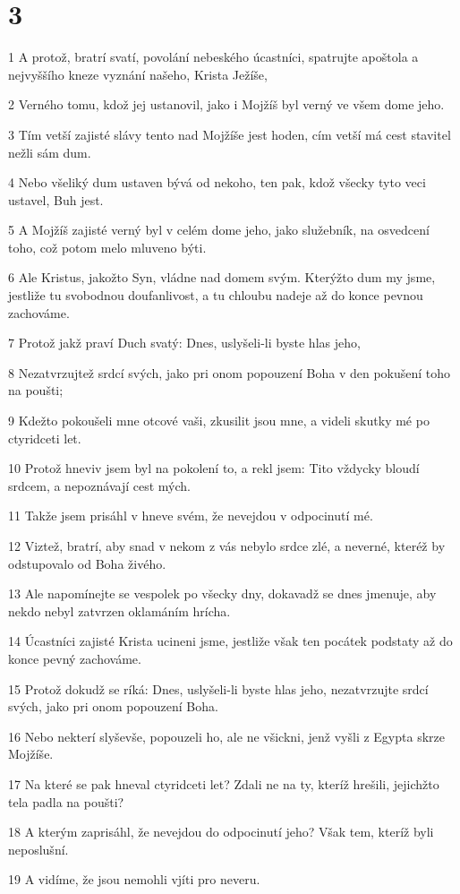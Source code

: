 \chapter{3}

\par 1 A protož, bratrí svatí, povolání nebeského úcastníci, spatrujte apoštola a nejvyššího kneze vyznání našeho, Krista Ježíše,
\par 2 Verného tomu, kdož jej ustanovil, jako i Mojžíš byl verný ve všem dome jeho.
\par 3 Tím vetší zajisté slávy tento nad Mojžíše jest hoden, cím vetší má cest stavitel nežli sám dum.
\par 4 Nebo všeliký dum ustaven bývá od nekoho, ten pak, kdož všecky tyto veci ustavel, Buh jest.
\par 5 A Mojžíš zajisté verný byl v celém dome jeho, jako služebník, na osvedcení toho, což potom melo mluveno býti.
\par 6 Ale Kristus, jakožto Syn, vládne nad domem svým. Kterýžto dum my jsme, jestliže tu svobodnou doufanlivost, a tu chloubu nadeje až do konce pevnou zachováme.
\par 7 Protož jakž praví Duch svatý: Dnes, uslyšeli-li byste hlas jeho,
\par 8 Nezatvrzujtež srdcí svých, jako pri onom popouzení Boha v den pokušení toho na poušti;
\par 9 Kdežto pokoušeli mne otcové vaši, zkusilit jsou mne, a videli skutky mé po ctyridceti let.
\par 10 Protož hneviv jsem byl na pokolení to, a rekl jsem: Tito vždycky bloudí srdcem, a nepoznávají cest mých.
\par 11 Takže jsem prisáhl v hneve svém, že nevejdou v odpocinutí mé.
\par 12 Viztež, bratrí, aby snad v nekom z vás nebylo srdce zlé, a neverné, kteréž by odstupovalo od Boha živého.
\par 13 Ale napomínejte se vespolek po všecky dny, dokavadž se dnes jmenuje, aby nekdo nebyl zatvrzen oklamáním hrícha.
\par 14 Úcastníci zajisté Krista ucineni jsme, jestliže však ten pocátek podstaty až do konce pevný zachováme.
\par 15 Protož dokudž se ríká: Dnes, uslyšeli-li byste hlas jeho, nezatvrzujte srdcí svých, jako pri onom popouzení Boha.
\par 16 Nebo nekterí slyševše, popouzeli ho, ale ne všickni, jenž vyšli z Egypta skrze Mojžíše.
\par 17 Na které se pak hneval ctyridceti let? Zdali ne na ty, kteríž hrešili, jejichžto tela padla na poušti?
\par 18 A kterým zaprisáhl, že nevejdou do odpocinutí jeho? Však tem, kteríž byli neposlušní.
\par 19 A vidíme, že jsou nemohli vjíti pro neveru.

